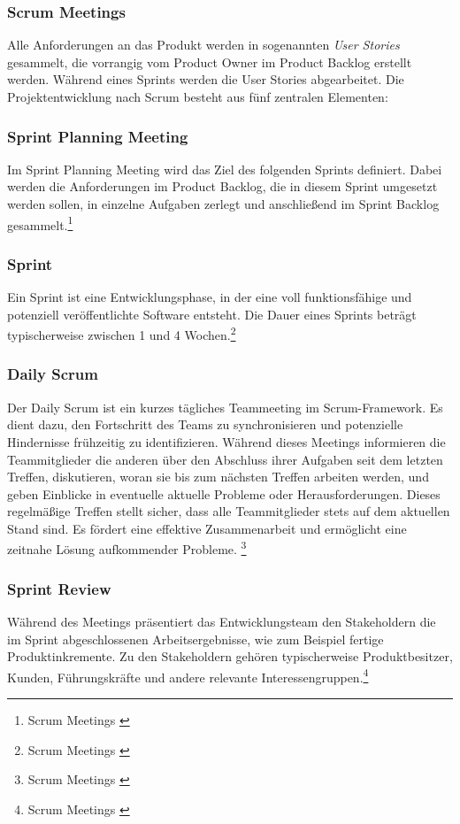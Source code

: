 \subsubsection{Scrum Meetings}
Alle Anforderungen an das Produkt werden in sogenannten \textit{User Stories} gesammelt, die vorrangig vom Product Owner
im Product Backlog erstellt werden. Während eines Sprints werden die User Stories abgearbeitet. Die Projektentwicklung
nach Scrum besteht aus fünf zentralen Elementen:

\subsubsection*{Sprint Planning Meeting}
Im Sprint Planning Meeting wird das Ziel des folgenden Sprints definiert. Dabei werden die Anforderungen im Product Backlog,
die in diesem Sprint umgesetzt werden sollen, in einzelne Aufgaben zerlegt und anschließend im Sprint Backlog gesammelt.\footnote{Scrum Meetings \cite{Sprint planing meeting}}

\subsubsection*{Sprint}
Ein Sprint ist eine Entwicklungsphase, in der eine voll funktionsfähige und potenziell veröffentlichte Software entsteht.
Die Dauer eines Sprints beträgt typischerweise zwischen 1 und 4 Wochen.\footnote{Scrum Meetings \cite{Sprint}}

\subsubsection*{Daily Scrum}
Der Daily Scrum ist ein kurzes tägliches Teammeeting im Scrum-Framework. Es dient dazu, den Fortschritt des Teams zu
synchronisieren und potenzielle Hindernisse frühzeitig zu identifizieren. Während dieses Meetings informieren die Teammitglieder
die anderen über den Abschluss ihrer Aufgaben seit dem letzten Treffen, diskutieren, woran sie bis zum nächsten Treffen
arbeiten werden, und geben Einblicke in eventuelle aktuelle Probleme oder Herausforderungen. Dieses regelmäßige Treffen
stellt sicher, dass alle Teammitglieder stets auf dem aktuellen Stand sind. Es fördert eine effektive Zusammenarbeit und
ermöglicht eine zeitnahe Lösung aufkommender Probleme. \footnote{Scrum Meetings \cite{Daily Scrum}}

\subsubsection*{Sprint Review}
Während des Meetings präsentiert das Entwicklungsteam den Stakeholdern die im Sprint abgeschlossenen Arbeitsergebnisse,
wie zum Beispiel fertige Produktinkremente. Zu den Stakeholdern gehören typischerweise Produktbesitzer, Kunden, Führungskräfte
und andere relevante Interessengruppen.\footnote{Scrum Meetings \cite{Sprint Review}}

